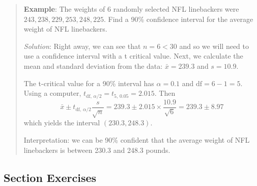 \documentclass[
]{book}
\begin{document}
\begin{quote}
\textbf{Example}: The weights of 6 randomly selected NFL linebackers were \(243, 238, 229, 253, 248, 225\). Find a 90\% confidence interval for the average weight of NFL linebackers.

\emph{Solution}: Right away, we can see that \(n=6<30\) and so we will need to use a confidence interval with a t critical value. Next, we calculate the mean and standard deviation from the data: \(\bar{x} = 239.3\) and \(s = 10.9\).

The t-critical value for a 90\% interval has \(\alpha=0.1\) and \(\text{df}=6-1=5\). Using a computer, \(t_{\text{df}, \, \alpha/2} = t_{5, \, 0.05} = 2.015\). Then
\[ \bar{x} \pm t_{\text{df}, \, \alpha/2}\frac{s}{\sqrt{n}} = 239.3 \pm 2.015 \times \frac{10.9}{\sqrt{6}} = 239.3 \pm 8.97\]
which yields the interval \((230.3, 248.3)\).

Interpretation: we can be 90\% confident that the average weight of NFL linebackers is between 230.3 and 248.3 pounds.
\end{quote}

\subsection*{Section Exercises}\label{section-exercises-20}
\end{document}
